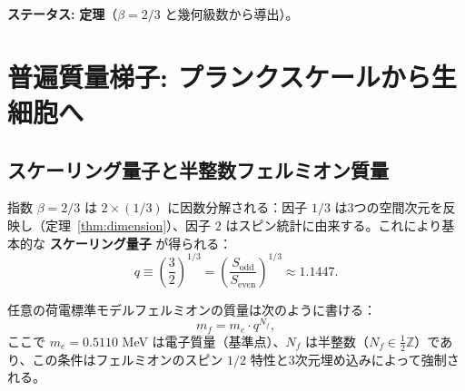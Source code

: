 \documentclass[12pt,a4paper]{article}
\begin{document}
	\textbf{ステータス:} \textbf{定理}（\(\beta = 2/3\) と幾何級数から導出）。
	
	\section{普遍質量梯子: プランクスケールから生細胞へ}
	\label{sec:mass-ladder}
	
	\subsection{スケーリング量子と半整数フェルミオン質量}
	
	指数 \(\beta = 2/3\) は \(2 \times (1/3)\) に因数分解される：因子 \(1/3\) は3つの空間次元を反映し（定理~\ref{thm:dimension}）、因子 \(2\) はスピン統計に由来する。これにより基本的な \textbf{スケーリング量子} が得られる：
	\begin{equation}
		q \equiv \left(\frac{3}{2}\right)^{1/3} = \left(\frac{S_{\mathrm{odd}}}{S_{\mathrm{even}}}\right)^{1/3} \approx 1.1447.
	\end{equation}
	
	任意の荷電標準モデルフェルミオンの質量は次のように書ける：
	\begin{equation}
		\boxed{m_f = m_e \cdot q^{N_f}},
		\label{eq:mass-quantization}
	\end{equation}
	ここで \(m_e = 0.5110\) MeV は電子質量（基準点）、\(N_f\) は半整数（\(N_f \in \frac{1}{2}\mathbb{Z}\)）であり、この条件はフェルミオンのスピン \(1/2\) 特性と3次元埋め込みによって強制される。
	
\end{document}
